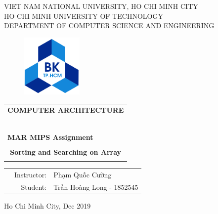 \documentclass[a4paper]{article}
\begin{document}
\begin{titlepage}
\begin{center}
VIET NAM NATIONAL UNIVERSITY, HO CHI MINH CITY \\
HO CHI MINH UNIVERSITY OF TECHNOLOGY\\
DEPARTMENT OF COMPUTER SCIENCE AND ENGINEERING 
\end{center}

\vspace{1cm}

\begin{figure}[h!]
\begin{center}
\includegraphics[width=3cm]{hcmut.png}
\end{center}
\end{figure}

\vspace{1cm}


\begin{center}
\begin{tabular}{c}
\multicolumn{1}{l}{\textbf{{\Large COMPUTER ARCHITECTURE}}}\\
~~\\
\hline
\\
\multicolumn{1}{l}{\textbf{{\Large MAR MIPS Assignment}}}\\
\\
\textbf{{\Huge Sorting and Searching on Array}}\\
\\
\hline
\end{tabular}
\end{center}

\vspace{3cm}

\begin{table}[h]
\begin{tabular}{rrl}
\hspace{5 cm} & Instructor: & Phạm Quốc Cường\\
& Student: & Trần Hoàng Long - 1852545 \\
\end{tabular}
\end{table}

\begin{center}
{\footnotesize Ho Chi Minh City, Dec 2019}
\end{center}
\end{titlepage}
\end{document}
